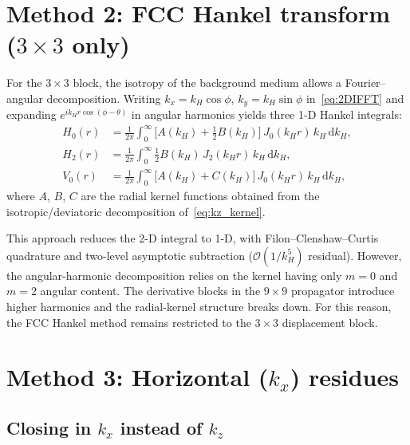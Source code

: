 \documentclass[11pt,a4paper]{article}
\newcommand{\dd}{\mathrm{d}}
\newcommand{\order}[1]{\mathcal{O}\!\left(#1\right)}
\begin{document}
\section{Method 2: FCC Hankel transform (\texorpdfstring{$3\times 3$}{3x3} only)}
  \label{sec:fcc}

For the $3\times 3$ block, the isotropy of the background medium
allows a Fourier--angular decomposition.  Writing
$k_x = k_H\cos\phi$, $k_y = k_H\sin\phi$ in~\eqref{eq:2DIFFT}
and expanding $e^{ik_H r\cos(\phi-\theta)}$ in angular harmonics
yields three 1-D Hankel integrals:
\begin{equation}\label{eq:hankel}
\begin{aligned}
  H_0(r) &= \frac{1}{2\pi}\int_0^\infty
    \bigl[A(k_H)+\tfrac{1}{2}B(k_H)\bigr]\,
    J_0(k_H r)\,k_H\,\dd k_H,\\
  H_2(r) &= \frac{1}{2\pi}\int_0^\infty
    \tfrac{1}{2}B(k_H)\,
    J_2(k_H r)\,k_H\,\dd k_H,\\
  V_0(r) &= \frac{1}{2\pi}\int_0^\infty
    \bigl[A(k_H)+C(k_H)\bigr]\,
    J_0(k_H r)\,k_H\,\dd k_H,
\end{aligned}
\end{equation}
where $A$, $B$, $C$ are the radial kernel functions obtained
from the isotropic/deviatoric decomposition of~\eqref{eq:kz_kernel}.

This approach reduces the 2-D integral to 1-D, with
Filon--Clenshaw--Curtis quadrature and two-level asymptotic
subtraction ($\order{1/k_H^5}$ residual).
However, the angular-harmonic decomposition relies on
the kernel having only $m=0$ and $m=2$ angular content.
The derivative blocks in the $9\times 9$ propagator
introduce higher harmonics and the radial-kernel
structure breaks down.
For this reason, the FCC Hankel method remains
restricted to the $3\times 3$ displacement block.


\section{Method 3: Horizontal (\texorpdfstring{$k_x$}{kx}) residues}\label{sec:kx}

\subsection{Closing in \texorpdfstring{$k_x$}{kx} instead of \texorpdfstring{$k_z$}{kz}}
\end{document}

